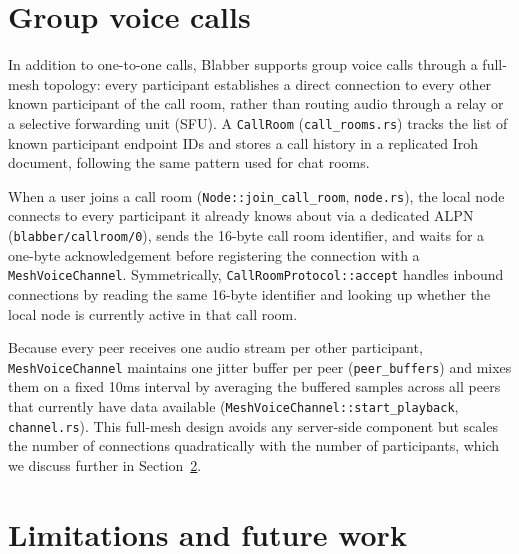 \section{Group voice calls}

In addition to one-to-one calls, Blabber supports group voice calls
through a full-mesh topology: every participant establishes a direct
connection to every other known participant of the call room, rather
than routing audio through a relay or a selective forwarding unit
(SFU). A \texttt{CallRoom} (\texttt{call\_rooms.rs}) tracks the list of
known participant endpoint IDs and stores a call history in a
replicated Iroh document, following the same pattern used for chat
rooms.

When a user joins a call room (\texttt{Node::join\_call\_room},
\texttt{node.rs}), the local node connects to every participant it
already knows about via a dedicated ALPN
(\texttt{blabber/callroom/0}), sends the 16-byte call room identifier,
and waits for a one-byte acknowledgement before registering the
connection with a \texttt{MeshVoiceChannel}. Symmetrically,
\texttt{CallRoomProtocol::accept} handles inbound connections by
reading the same 16-byte identifier and looking up whether the local
node is currently active in that call room.

Because every peer receives one audio stream per other participant,
\texttt{MeshVoiceChannel} maintains one jitter buffer per peer
(\texttt{peer\_buffers}) and mixes them on a fixed 10ms interval by
averaging the buffered samples across all peers that currently have
data available (\texttt{MeshVoiceChannel::start\_playback},
\texttt{channel.rs}). This full-mesh design avoids any server-side
component but scales the number of connections quadratically with the
number of participants, which we discuss further in
Section~\ref{sec:limitations}.


\section{Limitations and future work}
\label{sec:limitations}

